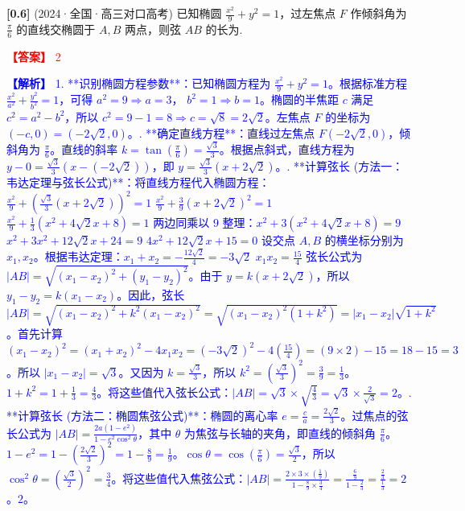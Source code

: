 \documentclass[varwidth=16cm, border=2mm]{standalone}
\begin{document}
\textbf{[0.6]} (2024·全国·高三对口高考) 已知椭圆 $\frac{x^2}{9} + y^2 = 1$，过左焦点 $F$ 作倾斜角为 $\frac{\pi}{6}$ 的直线交椭圆于 $A, B$ 两点，则弦 $AB$ 的长为\underline{\hspace{1.5cm}}.

\vspace{0.2cm}\par\noindent\textcolor{red}{\textbf{【答案】} 2}
\par\noindent\textcolor{blue}{\textbf{【解析】} 1. **识别椭圆方程参数**：\n   已知椭圆方程为 $\frac{x^2}{9} + y^2 = 1$。\n   根据标准方程 $\frac{x^2}{a^2} + \frac{y^2}{b^2} = 1$，可得 $a^2 = 9 \Rightarrow a = 3$， $b^2 = 1 \Rightarrow b = 1$。\n   椭圆的半焦距 $c$ 满足 $c^2 = a^2 - b^2$，所以 $c^2 = 9 - 1 = 8 \Rightarrow c = \sqrt{8} = 2\sqrt{2}$。\n   左焦点 $F$ 的坐标为 $(-c, 0) = (-2\sqrt{2}, 0)$。\n{}. **确定直线方程**：\n   直线过左焦点 $F(-2\sqrt{2}, 0)$，倾斜角为 $\frac{\pi}{6}$。\n   直线的斜率 $k = \tan(\frac{\pi}{6}) = \frac{\sqrt{3}}{3}$。\n   根据点斜式，直线方程为 $y - 0 = \frac{\sqrt{3}}{3}(x - (-2\sqrt{2}))$，即 $y = \frac{\sqrt{3}}{3}(x + 2\sqrt{2})$。\n{}. **计算弦长 (方法一：韦达定理与弦长公式)**：\n   将直线方程代入椭圆方程：\n   $\frac{x^2}{9} + \left(\frac{\sqrt{3}}{3}(x + 2\sqrt{2})\right)^2 = 1$ \n   $\frac{x^2}{9} + \frac{3}{9}(x + 2\sqrt{2})^2 = 1$ \n   $\frac{x^2}{9} + \frac{1}{3}(x^2 + 4\sqrt{2}x + 8) = 1$ \n   两边同乘以 $9$ 整理：\n   $x^2 + 3(x^2 + 4\sqrt{2}x + 8) = 9$ \n   $x^2 + 3x^2 + 12\sqrt{2}x + 24 = 9$ \n   $4x^2 + 12\sqrt{2}x + 15 = 0$ \n   设交点 $A, B$ 的横坐标分别为 $x_1, x_2$。根据韦达定理：\n   $x_1 + x_2 = -\frac{12\sqrt{2}}{4} = -3\sqrt{2}$ \n   $x_1 x_2 = \frac{15}{4}$ \n   弦长公式为 $|AB| = \sqrt{(x_1 - x_2)^2 + (y_1 - y_2)^2}$。\n   由于 $y = k(x + 2\sqrt{2})$，所以 $y_1 - y_2 = k(x_1 - x_2)$。\n   因此，弦长 $|AB| = \sqrt{(x_1 - x_2)^2 + k^2(x_1 - x_2)^2} = \sqrt{(x_1 - x_2)^2(1 + k^2)} = |x_1 - x_2|\sqrt{1 + k^2}$。\n   首先计算 $(x_1 - x_2)^2 = (x_1 + x_2)^2 - 4x_1 x_2 = (-3\sqrt{2})^2 - 4(\frac{15}{4}) = (9 \times 2) - 15 = 18 - 15 = 3$。\n   所以 $|x_1 - x_2| = \sqrt{3}$。\n   又因为 $k = \frac{\sqrt{3}}{3}$，所以 $k^2 = (\frac{\sqrt{3}}{3})^2 = \frac{3}{9} = \frac{1}{3}$。\n   $1 + k^2 = 1 + \frac{1}{3} = \frac{4}{3}$。\n   将这些值代入弦长公式：\n   $|AB| = \sqrt{3} \times \sqrt{\frac{4}{3}} = \sqrt{3} \times \frac{2}{\sqrt{3}} = 2$。\n{}. **计算弦长 (方法二：椭圆焦弦公式)**：\n   椭圆的离心率 $e = \frac{c}{a} = \frac{2\sqrt{2}}{3}$。\n   过焦点的弦长公式为 $|AB| = \frac{2a(1 - e^2)}{1 - e^2 \cos^2 \theta}$，其中 $\theta$ 为焦弦与长轴的夹角，即直线的倾斜角 $\frac{\pi}{6}$。\n   $1 - e^2 = 1 - (\frac{2\sqrt{2}}{3})^2 = 1 - \frac{8}{9} = \frac{1}{9}$。\n   $\cos \theta = \cos(\frac{\pi}{6}) = \frac{\sqrt{3}}{2}$，所以 $\cos^2 \theta = (\frac{\sqrt{3}}{2})^2 = \frac{3}{4}$。\n   将这些值代入焦弦公式：\n   $|AB| = \frac{2 \times 3 \times (\frac{1}{9})}{1 - \frac{8}{9} \times \frac{3}{4}} = \frac{\frac{6}{9}}{1 - \frac{2}{3}} = \frac{\frac{2}{3}}{\frac{1}{3}} = 2$。\n{} $2$。}
\end{document}
